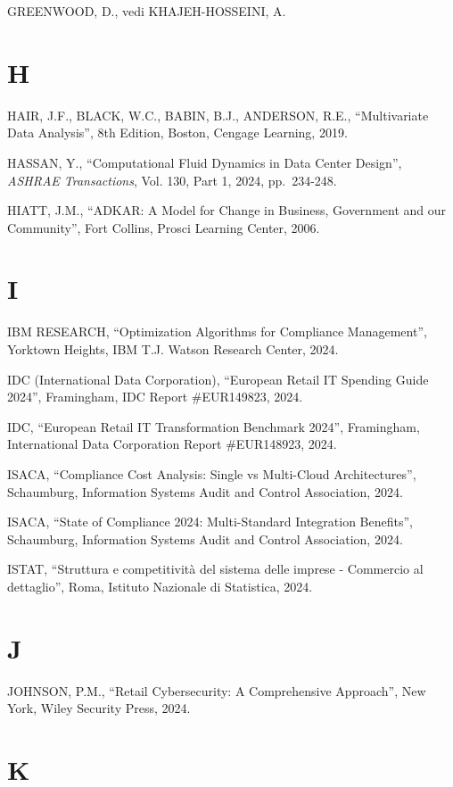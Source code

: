 \documentclass[12pt,a4paper,oneside]{book}
\numberwithin{figure}{chapter} %
\numberwithin{table}{chapter}  %
\begin{document}
GREENWOOD, D., vedi KHAJEH-HOSSEINI, A.

\section{H}\label{h-1}

HAIR, J.F., BLACK, W.C., BABIN, B.J., ANDERSON, R.E., ``Multivariate
Data Analysis'', 8th Edition, Boston, Cengage Learning, 2019.

HASSAN, Y., ``Computational Fluid Dynamics in Data Center Design'',
\emph{ASHRAE Transactions}, Vol. 130, Part 1, 2024, pp.~234-248.

HIATT, J.M., ``ADKAR: A Model for Change in Business, Government and our
Community'', Fort Collins, Prosci Learning Center, 2006.

\section{I}\label{i-1}

IBM RESEARCH, ``Optimization Algorithms for Compliance Management'',
Yorktown Heights, IBM T.J. Watson Research Center, 2024.

IDC (International Data Corporation), ``European Retail IT Spending
Guide 2024'', Framingham, IDC Report \#EUR149823, 2024.

IDC, ``European Retail IT Transformation Benchmark 2024'', Framingham,
International Data Corporation Report \#EUR148923, 2024.

ISACA, ``Compliance Cost Analysis: Single vs Multi-Cloud
Architectures'', Schaumburg, Information Systems Audit and Control
Association, 2024.

ISACA, ``State of Compliance 2024: Multi-Standard Integration
Benefits'', Schaumburg, Information Systems Audit and Control
Association, 2024.

ISTAT, ``Struttura e competitività del sistema delle imprese - Commercio
al dettaglio'', Roma, Istituto Nazionale di Statistica, 2024.

\section{J}\label{j-1}

JOHNSON, P.M., ``Retail Cybersecurity: A Comprehensive Approach'', New
York, Wiley Security Press, 2024.

\section{K}\label{k-1}
\end{document}
